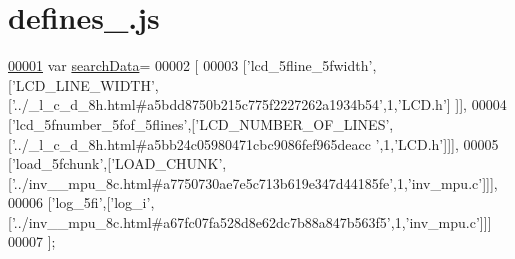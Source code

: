 \hypertarget{defines__9_8js_source}{}\section{defines\+\_.\+js}
\label{defines__9_8js_source}

\begin{DoxyCode}
\hypertarget{defines__9_8js_source.tex_l00001}{}\hyperlink{defines__9_8js_ad01a7523f103d6242ef9b0451861231e}{00001} var \hyperlink{defines__9_8js_ad01a7523f103d6242ef9b0451861231e}{searchData}=
00002 [
00003   [\textcolor{stringliteral}{'lcd\_5fline\_5fwidth'},[\textcolor{stringliteral}{'LCD\_LINE\_WIDTH'},[\textcolor{stringliteral}{'../\_l\_c\_d\_8h.html#a5bdd8750b215c775f2227262a1934b54'},1,\textcolor{stringliteral}{'LCD.h'}]
      ]],
00004   [\textcolor{stringliteral}{'lcd\_5fnumber\_5fof\_5flines'},[\textcolor{stringliteral}{'LCD\_NUMBER\_OF\_LINES'},[\textcolor{stringliteral}{'../\_l\_c\_d\_8h.html#a5bb24c05980471cbc9086fef965deacc
      '},1,\textcolor{stringliteral}{'LCD.h'}]]],
00005   [\textcolor{stringliteral}{'load\_5fchunk'},[\textcolor{stringliteral}{'LOAD\_CHUNK'},[\textcolor{stringliteral}{'../inv\_\_mpu\_8c.html#a7750730ae7e5c713b619e347d44185fe'},1,\textcolor{stringliteral}{'inv\_mpu.c'}]]],
00006   [\textcolor{stringliteral}{'log\_5fi'},[\textcolor{stringliteral}{'log\_i'},[\textcolor{stringliteral}{'../inv\_\_mpu\_8c.html#a67fc07fa528d8e62dc7b88a847b563f5'},1,\textcolor{stringliteral}{'inv\_mpu.c'}]]]
00007 ];
\end{DoxyCode}
